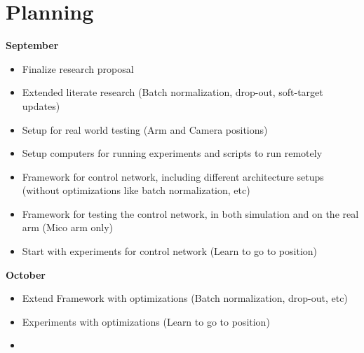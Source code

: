 \section{Planning}

\textbf{September}
\begin{itemize}
  \item Finalize research proposal
  \item Extended literate research (Batch normalization, drop-out, soft-target updates)
  \item Setup for real world testing (Arm and Camera positions)
  \item Setup computers for running experiments and scripts to run remotely
  \item Framework for control network, including different architecture setups (without optimizations like batch normalization, etc)
  \item Framework for testing the control network, in both simulation and on the real arm (Mico arm only)
  \item Start with experiments for control network (Learn to go to position)
\end{itemize} 
\textbf{October}
\begin{itemize}
 \item Extend Framework with optimizations (Batch normalization, drop-out, etc)
 \item Experiments with optimizations (Learn to go to position)
 \item 
\end{itemize}



  
  
